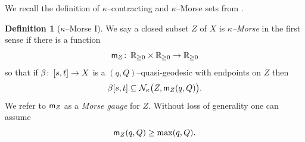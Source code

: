 \documentclass{amsart}
\theoremstyle{definition}
\newtheorem{defn}[thm]{Definition}
\theoremstyle{remark}
\newcommand{\U}{ X}
\newcommand{\calN}{\mathcal{N}}
\newcommand{\from}{\colon\thinspace}
\newcommand{\mm}{{\sf m}}
\begin{document}
We recall the definition of $\kappa$--contracting and $\kappa$--Morse sets from \cite{QRT2}. 


\begin{defn}[$\kappa$--Morse I] \label{Def:W-Morse} 
We say a closed subset $Z$ of $\U$ is \emph{$\kappa$--Morse} in the first sense if there is a function
\[
\mm_Z \from \mathbb R_{\ge 0}\times \mathbb R_{\ge 0} \to \mathbb R_{\ge 0}
\]
so that if $\beta \from [s,t] \to \U$ is a $(q, Q)$--quasi-geodesic with endpoints 
on $Z$ then
\[
\beta[s,t]  \subseteq\calN_{\kappa} \big(Z,  \mm_Z(q, Q)\big). 
\]
We refer to $\mm_{Z}$ as a \emph{Morse gauge} for $Z$. Without loss of generality one can assume
\begin{equation}
\mm_Z(q, Q) \geq \max(q, Q). 
\end{equation} 
\end{defn} 
\end{document}
